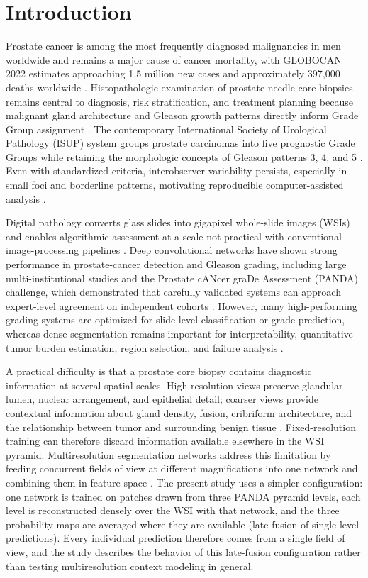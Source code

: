 \documentclass[10pt,letterpaper]{article}
\begin{document}
\section*{Introduction}
Prostate cancer is among the most frequently diagnosed malignancies in men worldwide and remains a major cause of cancer mortality, with GLOBOCAN 2022 estimates approaching 1.5 million new cases and approximately 397,000 deaths worldwide \cite{bib1}. Histopathologic examination of prostate needle-core biopsies remains central to diagnosis, risk stratification, and treatment planning because malignant gland architecture and Gleason growth patterns directly inform Grade Group assignment \cite{bib3,bib4,bib5}. The contemporary International Society of Urological Pathology (ISUP) system groups prostate carcinomas into five prognostic Grade Groups while retaining the morphologic concepts of Gleason patterns 3, 4, and 5 \cite{bib3,bib4}. Even with standardized criteria, interobserver variability persists, especially in small foci and borderline patterns, motivating reproducible computer-assisted analysis \cite{bib6,bib7}.

Digital pathology converts glass slides into gigapixel whole-slide images (WSIs) and enables algorithmic assessment at a scale not practical with conventional image-processing pipelines \cite{bib8,bib9}. Deep convolutional networks have shown strong performance in prostate-cancer detection and Gleason grading, including large multi-institutional studies and the Prostate cANcer graDe Assessment (PANDA) challenge, which demonstrated that carefully validated systems can approach expert-level agreement on independent cohorts \cite{bib10,bib11,bib12}. However, many high-performing grading systems are optimized for slide-level classification or grade prediction, whereas dense segmentation remains important for interpretability, quantitative tumor burden estimation, region selection, and failure analysis \cite{bib13,bib14}.

A practical difficulty is that a prostate core biopsy contains diagnostic information at several spatial scales. High-resolution views preserve glandular lumen, nuclear arrangement, and epithelial detail; coarser views provide contextual information about gland density, fusion, cribriform architecture, and the relationship between tumor and surrounding benign tissue \cite{bib3,bib15}. Fixed-resolution training can therefore discard information available elsewhere in the WSI pyramid. Multiresolution segmentation networks address this limitation by feeding concurrent fields of view at different magnifications into one network and combining them in feature space \cite{bibSchmitz,bib17,bib18,bibHo}. The present study uses a simpler configuration: one network is trained on patches drawn from three PANDA pyramid levels, each level is reconstructed densely over the WSI with that network, and the three probability maps are averaged where they are available (late fusion of single-level predictions). Every individual prediction therefore comes from a single field of view, and the study describes the behavior of this late-fusion configuration rather than testing multiresolution context modeling in general.
\end{document}
